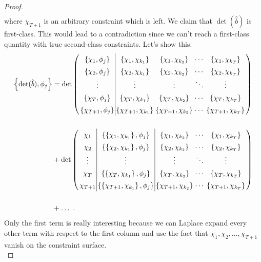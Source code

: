 \begin{proof}
\begin{align}
\end{align}
where $\chi_{T+1}$ is an arbitrary constraint which is left. We claim that $\det (\hat{b})$ is first-class. This would lead to a contradiction since we can't reach a first-class quantity with true second-class constraints.
Let's show this: \\
\begin{align}
\left\{ \det (\hat{b}),\phi_j \right\} &= 
\det \left( 
\arraycolsep=1.4pt\def\arraystretch{1.4}
\begin{array}{c|cccc}
\left\{ \chi_1,\phi_j \right\} & \left\{ \chi_1,\chi_{k_1} \right\} & \left\{ \chi_1,\chi_{k_2} \right\} & \cdots & \left\{ \chi_1,\chi_{k_T} \right\} \\
\left\{ \chi_2,\phi_j \right\} & \left\{ \chi_2,\chi_{k_1} \right\} & \left\{ \chi_2,\chi_{k_2} \right\} & \cdots & \left\{ \chi_2,\chi_{k_T} \right\} \\
\vdots & \vdots & \vdots & \ddots & \vdots \\
\left\{ \chi_T,\phi_j \right\} & \left\{ \chi_T,\chi_{k_1} \right\} & \left\{ \chi_T,\chi_{k_2} \right\} & \cdots & \left\{ \chi_T,\chi_{k_T} \right\} \\
\left\{ \chi_{T+1},\phi_j \right\} & \left\{ \chi_{T+1},\chi_{k_1} \right\} & \left\{ \chi_{T+1},\chi_{k_2} \right\} & \cdots & \left\{ \chi_{T+1},\chi_{k_T} \right\} 
\end{array} \right) \notag \\[14pt] 
&+ 
\det \left( 
\arraycolsep=1.4pt\def\arraystretch{1.4}
\begin{array}{c|c|ccc}
\chi_1 & \left\{ \left\{ \chi_1,\chi_{k_1} \right\},\phi_j \right\} & \left\{ \chi_1,\chi_{k_2} \right\} & \cdots & \left\{ \chi_1,\chi_{k_T} \right\} \\
\chi_2 & \left\{ \left\{ \chi_2,\chi_{k_1} \right\},\phi_j \right\} & \left\{ \chi_2,\chi_{k_2} \right\} & \cdots & \left\{ \chi_2,\chi_{k_T} \right\} \\
\vdots & \vdots & \vdots & \ddots & \vdots \\
\chi_T & \left\{ \left\{ \chi_T,\chi_{k_1} \right\},\phi_j \right\} & \left\{ \chi_T,\chi_{k_2} \right\} & \cdots & \left\{ \chi_T,\chi_{k_T} \right\} \\
\chi_{T+1} & \left\{ \left\{ \chi_{T+1},\chi_{k_1} \right\},\phi_j \right\} & \left\{ \chi_{T+1},\chi_{k_2} \right\} & \cdots & \left\{ \chi_{T+1},\chi_{k_T} \right\} 
\end{array} \right) \notag \\[14pt] 
&+ \dots \ .
\end{align}
Only the first term is really interesting because we can Laplace expand every other term with respect to the first column and use the fact that $\chi_1, \chi_2, \dots, \chi_{T+1}$ vanish on the constraint surface. \\


\end{proof}
